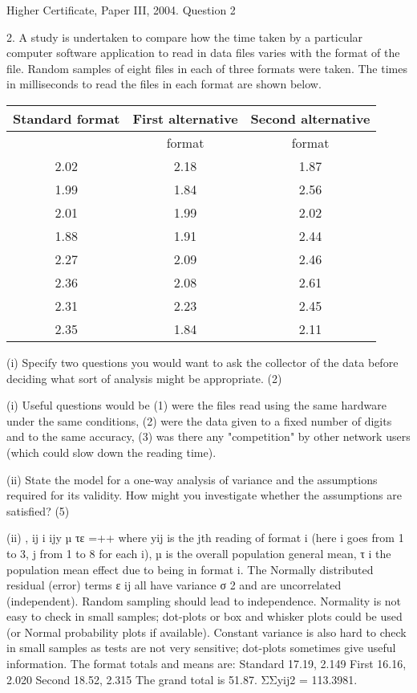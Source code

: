 \documentclass[a4paper,12pt]{article}
\begin{document}
Higher Certificate, Paper III, 2004.  Question 2 
\begin{framed}
2. A study is undertaken to compare how the time taken by a particular computer software application to read in data files varies with the format of the file.  Random samples of eight files in each of three formats were taken.  The times in milliseconds to read the files in each format are shown below. 
 
\begin{center}
\begin{tabular}{ccc}
Standard format	&	First alternative	& 	Second alternative	\\ \hline 
	&	format	& 	format	\\ \hline 
2.02	&	2.18	& 	1.87	\\ \hline 
1.99	&	1.84	& 	2.56	\\ \hline 
2.01	&	1.99	& 	2.02	\\ \hline 
1.88	&	1.91	& 	2.44	\\ \hline 
2.27	&	2.09	& 	2.46	\\ \hline 
2.36	&	2.08	& 	2.61	\\ \hline 
2.31	&	2.23	& 	2.45	\\ \hline 
2.35	&	1.84	& 	2.11	\\ \hline 
\end{tabular}
\end{center} 
 
 
(i) Specify two questions you would want to ask the collector of the data before deciding what sort of analysis might be appropriate. (2) 
\end{framed}



(i) Useful questions would be (1) were the files read using the same hardware under the same conditions, (2) were the data given to a fixed number of digits and to the same accuracy, (3) was there any "competition" by other network users (which could slow down the reading time). 


\newpage

\begin{framed}
(ii) State the model for a one-way analysis of variance and the assumptions required for its validity.  How might you investigate whether the assumptions are satisfied? (5) 
\end{framed}
 
(ii) , ij i ijy µ τε =++ where yij is the jth reading of format i (here i goes from 1 to 3, j from 1 to 8 for each i), µ is the overall population general mean, τ i the population mean effect due to being in format i.  The Normally distributed residual (error) terms ε ij all have variance σ 2 and are uncorrelated (independent).  Random sampling should lead to independence.  Normality is not easy to check in small samples;  dot-plots or box and whisker plots could be used (or Normal probability plots if available).  Constant variance is also hard to check in small samples as tests are not very sensitive;  dot-plots sometimes give useful information. 
 The format totals and means are: Standard 17.19, 2.149  First 16.16, 2.020  Second 18.52, 2.315 
 The grand total is 51.87.    ΣΣyij2 = 113.3981. 
 
\end{document}
